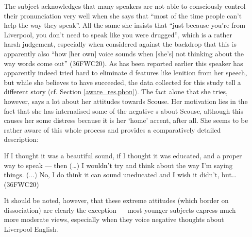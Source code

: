 The subject acknowledges that many speakers are not able to consciously control their pronunciation very well when she says that ``most of the time people can't help the way they speak''.
All the same she insists that ``just because you're from Liverpool, you don't need to speak like you were drugged'', which is a rather harsh judgement, especially when considered against the backdrop that this is apparently also ``how [her own] voice sounds when [she's] not thinking about the way words come out'' (36FWC20).
As has been reported earlier this speaker has apparently indeed tried hard to eliminate d features like lenition from her speech, but while she believes to have succeeded, the data collected for this study tell a different story (cf. Section \ref{aware_res.phon}).
The fact alone that she tries, however, says a lot about her attitudes towards Scouse.
Her motivation lies in the fact that she has internalised some of the negative s about Scouse, although this causes her some distress because it is her `home' accent, after all.
She seems to be rather aware  of this whole process and provides a comparatively detailed description:
\begin{example}
	If I thought it was a beautiful sound, if I thought it was educated, and  a proper way to speak --- then (\ldots) I wouldn't try and think about the way I'm saying things. (...) No, I do think it can sound uneducated and I wish it didn't, but\ldots (36FWC20)
\end{example}
It should be noted, however, that these extreme attitudes (which border on dissociation) are clearly the exception --- most younger subjects express much more moderate views, especially when they voice negative thoughts about Liverpool English.